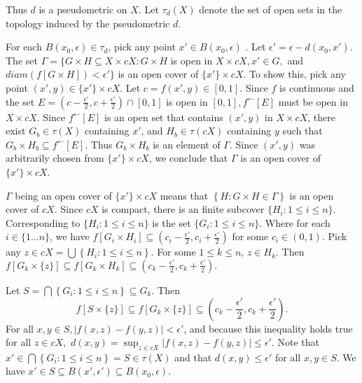 \documentclass{article}
\begin{document}
Thus $d$ is a pseudometric on $X$. Let $\tau_d(X)$ denote the set of open sets in the topology induced by the pseudometric $d$. 

\vskip 10pt

For each $B(x_0, \epsilon) \in \tau_d$, pick any point $x' \in B(x_0, \epsilon)$ . Let $\epsilon' = \epsilon - d(x_0,x').$ 
The set $\Gamma=\{ G \times H \subseteq X \times cX : G \times H$ is open in $X \times cX, x'\in G,$ and $diam\left(f\left[G\times H\right]\right)<\epsilon' \}$ is an open cover of $\{x'\} \times cX$. To show this, pick any point $(x',y)\in \{x'\} \times cX$. Let $c=f(x',y)\in [0,1].$ Since $f$ is continuous and the set $E=(c-\frac{\epsilon'}{2}, c+\frac{\epsilon'}{2}) \cap [0,1]$ is open in $[0,1], f^\leftarrow[E]$ must be open in $X\times cX$. Since $f^{\leftarrow}[E]$ is an open set that contains $(x',y)$ in $X\times cX$, there exist $G_b \in \tau(X)$ containing $x'$, and $H_b \in \tau(cX)$ containing $y$ such that $G_b\times H_b\subseteq f^\leftarrow[E]$. Thus $G_b\times H_b$ is an element of $\Gamma$. Since $(x',y)$ was arbitrarily chosen from $\{x'\}\times cX$, we conclude that $\Gamma$ is an open cover of $\{x'\}\times cX$.

\vskip 10pt

$\Gamma$ being an open cover of $\{x'\}\times cX$ means that $\left\{H : G\times H \in \Gamma\right\}$ is an open cover of $cX$. Since $cX$ is compact, there is an finite subcover $\{ H_i: 1\leq i \leq n\}.$ Corresponding to $\{ H_i: 1\leq i \leq n\}$ is the set $\{ G_i: 1\leq i \leq n\}$. Where for each $i \in \{1\dots n\}$, we have $f[G_i \times H_i] \subseteq (c_i-\frac{\epsilon'}{2}, c_i+\frac{\epsilon'}{2})$ for some $c_i \in (0,1).$ Pick any $z \in cX=\bigcup \left\{H_i: 1\leq i\leq n\right\}.$ For some $1 \leq k \leq n$, $z \in H_k$. Then $f[G_k\times \{z\}] \subseteq f[G_k\times H_k]\subseteq (c_k-\frac{\epsilon'}{2}, c_k+\frac{\epsilon'}{2}).$ 

\vskip 10pt

Let $S=\bigcap\left\{G_i:1\leq i \leq n\right\}  \subseteq G_k.$ Then 
$$f[S\times \{z\}]\subseteq f[G_k \times \{z\}] \subseteq (c_k-\frac{\epsilon'}{2}, c_k+\frac{\epsilon'}{2}).$$ 
\vskip 5pt
For all $x,y \in S, |f(x,z)-f(y,z)|<\epsilon'$, and because this inequality holds true for all $z \in cX,$ $d(x,y)=\displaystyle{\sup_{z\in cX}} |f(x,z)-f(y,z)|\leq \epsilon'.$ Note that $x' \in \bigcap \left\{G_i: 1\leq i \leq n\right\} = S\in \tau(X)$ and that $d(x,y)\leq \epsilon'$ for all $x,y \in S.$ We have $x' \in S \subseteq B(x',\epsilon') \subseteq B(x_0, \epsilon).$ 
\end{document}
